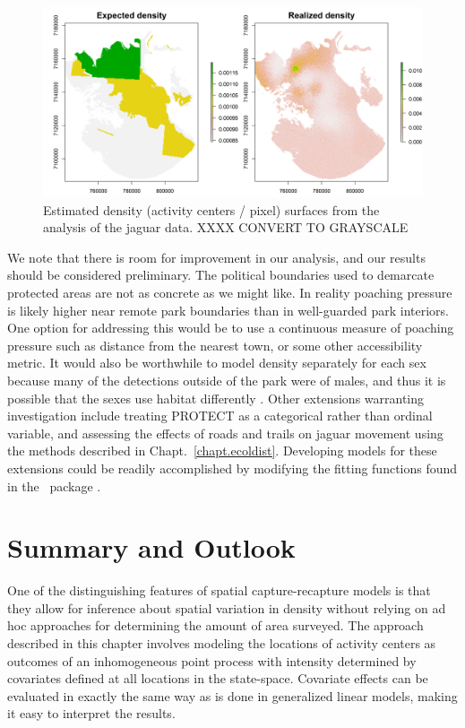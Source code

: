 \begin{figure}%
\centering
\includegraphics[width=\textwidth]{Ch11-Statespace/figs/reD}
\caption{Estimated density (activity centers / pixel) surfaces from
  the analysis of the jaguar data. XXXX CONVERT TO GRAYSCALE}
\label{state-space.fig.Dsurface}
\end{figure}

We note that there is room for improvement in our analysis, and our
results should be considered preliminary. The
political boundaries used to demarcate protected areas are not as
concrete as we might like. In reality poaching pressure is likely
higher near remote park boundaries than in well-guarded park
interiors. One option for addressing this would be to use a continuous
measure of poaching pressure such as distance from the nearest town,
or some other accessibility metric. It would also be worthwhile to
model density separately for each sex because many of the detections outside
of the park were of males, and thus it is possible that the sexes use
habitat differently \citep{conde_etal:2010}. Other extensions warranting
investigation include treating PROTECT as a categorical rather than
ordinal variable, and assessing the effects of
roads and trails on jaguar movement using the methods described in
Chapt.~\ref{chapt.ecoldist}. %
Developing models for these extensions
could be readily accomplished by modifying the fitting functions found
in the \R~package \scrbook.



\section{Summary and Outlook}

One of the distinguishing features of spatial capture-recapture models
is that they allow for inference about spatial variation
in density without relying on ad hoc approaches for determining the
amount of area surveyed. The approach described
in this chapter involves modeling the locations of activity centers as outcomes
of an inhomogeneous point process with intensity determined by
covariates defined at all locations in the state-space. Covariate
effects can be evaluated in exactly the same way as is done in
generalized linear models, making it easy to interpret the results.

